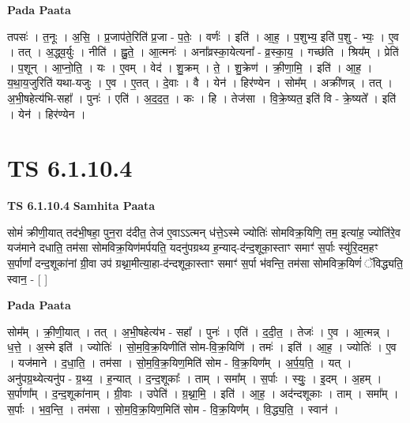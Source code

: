 \documentclass[17pt]{extarticle}
\begin{document}
\textbf{Pada Paata} \newline

तपसः॑ । त॒नूः । अ॒सि॒ । प्र॒जाप॑ते॒रिति॑ प्र॒जा - प॒तेः॒ । वर्णः॑ । इति॑ । आ॒ह॒ । प॒शुभ्य॒ इति॑ प॒शु - भ्यः॒ । ए॒व । तत् । अ॒द्ध्व॒र्युः । नीति॑ । ह्नु॒ते॒ । आ॒त्मनः॑ । अना᳚व्रस्का॒येत्यना᳚ - व्र॒स्का॒य॒ । गच्छ॑ति । श्रिय᳚म् । प्रेति॑ । प॒शून् । आ॒प्नो॒ति॒ । यः । ए॒वम् । वेद॑ । शु॒क्रम् । ते॒ । शु॒क्रेण॑ । क्री॒णा॒मि॒ । इति॑ । आ॒ह॒ । य॒था॒य॒जुरिति॑ यथा-यजुः । ए॒व । ए॒तत् । दे॒वाः । वै । येन॑ । हिर॑ण्येन । सोम᳚म् । अक्री॑णन्न् । तत् । अ॒भी॒षहेत्य॑भि-सहा᳚ । पुनः॑ । एति॑ । अ॒द॒द॒त॒ । कः । हि । तेज॑सा । वि॒क्रे॒ष्यत॒ इति॑ वि - क्रे॒ष्यते᳚ । इति॑ । येन॑ । हिर॑ण्येन ।  \newline





\section{ TS 6.1.10.4 }

\textbf{TS 6.1.10.4 } \newline
\textbf{Samhita Paata} \newline

सोमं॑ क्रीणी॒यात् तद॑भी॒षहा॒ पुन॒रा द॑दीत॒ तेज॑ ए॒वाऽऽत्मन् ध॑त्ते॒ऽस्मे ज्योतिः॑ सोमविक्र॒यिणि॒ तम॒ इत्या॑ह॒ ज्योति॑रे॒व यज॑माने दधाति॒ तम॑सा सोमविक्र॒यिण॑मर्पयति॒ यदनु॑पग्रथ्य ह॒न्याद्-द॑न्द॒शूका॒स्ताꣳ समाꣳ॑ स॒र्पाः स्यु॑रि॒दम॒हꣳ स॒र्पाणां᳚ दन्द॒शूका॑नां ग्री॒वा उप॑ ग्रथ्ना॒मीत्या॒हा-द॑न्दशूका॒स्ताꣳ समाꣳ॑ स॒र्पा भ॑वन्ति॒ तम॑सा सोमविक्र॒यिणं॑ ॅविद्ध्यति॒ स्वान॒ - [  ] \newline

\textbf{Pada Paata} \newline

सोम᳚म् । क्री॒णी॒यात् । तत् । अ॒भी॒षहेत्य॑भ - सहा᳚ । पुनः॑ । एति॑ । द॒दी॒त॒ । तेजः॑ । ए॒व । आ॒त्मन्न् । ध॒त्ते॒ । अ॒स्मे इति॑ । ज्योतिः॑ । सो॒म॒वि॒क्र॒यिणीति॑ सोम-वि॒क्र॒यिणि॑ । तमः॑ । इति॑ । आ॒ह॒ । ज्योतिः॑ । ए॒व । यज॑माने । द॒धा॒ति॒ । तम॑सा । सो॒म॒वि॒क्र॒यिण॒मिति॑ सोम - वि॒क्र॒यिण᳚म् । अ॒र्प॒य॒ति॒ । यत् । अनु॑पग्र॒थ्येत्यनु॑प - ग्र॒थ्य॒ । ह॒न्यात् । द॒न्द॒शूकाः᳚ । ताम् । समा᳚म् । स॒र्पाः । स्युः॒ । इ॒दम् । अ॒हम् । स॒र्पाणा᳚म् । द॒न्द॒शूका॑नाम् । ग्री॒वाः । उपेति॑ । ग्र॒थ्ना॒मि॒ । इति॑ । आ॒ह॒ । अद॑न्दशूकाः । ताम् । समा᳚म् । स॒र्पाः । भ॒व॒न्ति॒ । तम॑सा । सो॒म॒वि॒क्र॒यिण॒मिति॑ सोम - वि॒क्र॒यिण᳚म् । वि॒द्ध्य॒ति॒ । स्वान॑ ।  \newline
\end{document}

